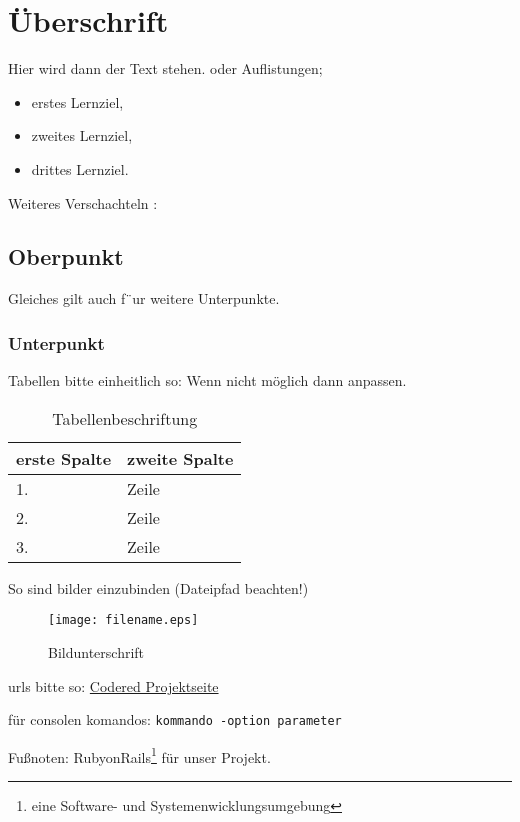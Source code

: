 \chapter{Überschrift}  %
\label{chapter:Überschrift}  %

Hier wird dann der Text stehen. 
oder Auflistungen;
\begin{itemize}
\item erstes Lernziel,
\item zweites Lernziel,
\item drittes Lernziel.
\end{itemize}

Weiteres Verschachteln :

\section{Oberpunkt}
\label{section:Oberpunkt}

Gleiches gilt auch f¨ur weitere Unterpunkte.

\subsection{Unterpunkt}
\label{subsection:Unterpunkt}


Tabellen bitte einheitlich so:
Wenn nicht möglich dann anpassen.

\begin{table}[htbp]
\begin{center}
\begin{tabular*}{0.95\textwidth}{p{}p{}}
\hline
\textbf{erste Spalte} & \textbf{zweite Spalte} \\
\hline
1. & Zeile \\
2. & Zeile \\
3. & Zeile \\
\hline
\end{tabular*}
\caption{Tabellenbeschriftung}
\label{table:Tabellenbeschriftung}
\end{center}
\end{table}



So sind bilder einzubinden (Dateipfad beachten!)
\begin{figure}[htbp]
\centering
\texttt{[image: filename.eps]}
\caption{Bildunterschrift}
\label{figure:Bildunterschrift}
\end{figure}


urls bitte so:
\href{http://codered.berlios.de}{Codered Projektseite}


für consolen komandos:
\verb|kommando -option parameter|

Fußnoten:
RubyonRails\footnote{eine Software- und Systemenwicklungsumgebung} für unser Projekt.
